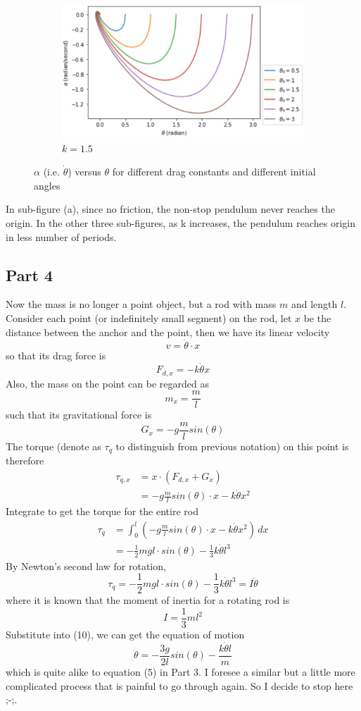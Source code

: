 \documentclass{article}
\begin{document}
\begin{figure}[H]
\begin{subfigure}{0.5\textwidth}
\includegraphics[width=0.9\linewidth, height=5cm]{AlphaThetaK15.jpg}
\caption{$k=1.5$}
\label{fig:subim4}
\end{subfigure}
\caption{$\alpha$ (i.e. $\dot{\theta}$) versus $\theta$ for different drag constants and different initial angles}
\label{fig:image1}
\end{figure}
\noindent In sub-figure (a), since no friction, the non-stop pendulum never reaches the origin. In the other three sub-figures, as k increases, the pendulum reaches origin in less number of periods.

\subsection{Part 4}
Now the mass is no longer a point object, but a rod with mass $m$ and length $l$. Consider each point (or indefinitely small segment) on the rod, let $x$ be the distance between the anchor and the point, then we have its linear velocity \[v=\dot{\theta}\cdot x\]
so that its drag force is \[F_{d,x}=-k\dot{\theta}x\]
Also, the mass on the point can be regarded as \[m_x=\frac{m}{l}\]
such that its gravitational force is \[G_x=-g\frac{m}{l}sin(\theta)\]
The torque (denote as $\tau_q$ to distinguish from previous notation) on this point is therefore
\begin{align*}
    \tau_{q, x} &= x \cdot (F_{d,x}+G_x)\\
    &= -g\frac{m}{l}sin(\theta)\cdot x-k\dot{\theta}x^2
\end{align*}
Integrate to get the torque for the entire rod
\begin{align*}
    \tau_q &= \int_{0}^{l} (-g\frac{m}{l}sin(\theta)\cdot x-k\dot{\theta}x^2) \,dx\\
    &= -\frac{1}{2}mgl\cdot sin(\theta)-\frac{1}{3}k\dot{\theta}l^3
\end{align*}
By Newton's second law for rotation, 
\[\tau_q=-\frac{1}{2}mgl\cdot sin(\theta)-\frac{1}{3}k\dot{\theta}l^3=I\ddot{\theta} \tag{10}\]
where it is known that the moment of inertia for a rotating rod is
\[I=\frac{1}{3}ml^2\]
Substitute into (10), we can get the equation of motion
\[\ddot{\theta}=-\frac{3g}{2l}sin(\theta)-\frac{k\dot{\theta}l}{m} \tag{11}\]
which is quite alike to equation (5) in Part 3. I foresee a similar but a little more complicated process that is painful to go through again. So I decide to stop here ;-;.
\end{document}
